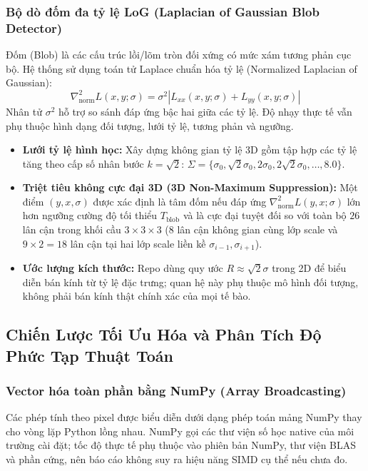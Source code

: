 \documentclass[conference]{IEEEtran}
\begin{document}
\subsubsection{Bộ dò đốm đa tỷ lệ LoG (Laplacian of Gaussian Blob Detector)}
Đốm (Blob) là các cấu trúc lồi/lõm tròn đối xứng có mức xám tương phản cục bộ.
Hệ thống sử dụng toán tử Laplace chuẩn hóa tỷ lệ (Normalized Laplacian of Gaussian):
\begin{equation}
\nabla_{\text{norm}}^2 L(x, y; \sigma) = \sigma^2 |L_{xx}(x, y; \sigma) + L_{yy}(x, y; \sigma)|
\end{equation}
Nhân tử $\sigma^2$ hỗ trợ so sánh đáp ứng bậc hai giữa các tỷ lệ. Độ nhạy thực tế vẫn phụ thuộc hình dạng đối tượng, lưới tỷ lệ, tương phản và ngưỡng.
\begin{itemize}
    \item \textbf{Lưới tỷ lệ hình học:} Xây dựng không gian tỷ lệ 3D gồm tập hợp các tỷ lệ tăng theo cấp số nhân bước $k = \sqrt{2}$: $\Sigma = \{\sigma_0, \sqrt{2}\sigma_0, 2\sigma_0, 2\sqrt{2}\sigma_0, \dots, 8.0\}$.
    \item \textbf{Triệt tiêu không cực đại 3D (3D Non-Maximum Suppression):} Một điểm $(y, x, \sigma)$ được xác định là tâm đốm nếu đáp ứng $\nabla_{\text{norm}}^2 L(y, x; \sigma)$ lớn hơn ngưỡng cường độ tối thiểu $T_{\text{blob}}$ và là cực đại tuyệt đối so với toàn bộ $26$ lân cận trong khối cầu $3 \times 3 \times 3$ (8 lân cận không gian cùng lớp scale và $9 \times 2 = 18$ lân cận tại hai lớp scale liền kề $\sigma_{i-1}, \sigma_{i+1}$).
    \item \textbf{Ước lượng kích thước:} Repo dùng quy ước $R\approx\sqrt2\sigma$ trong 2D để biểu diễn bán kính từ tỷ lệ đặc trưng; quan hệ này phụ thuộc mô hình đối tượng, không phải bán kính thật chính xác của mọi tế bào.
\end{itemize}



\subsection{Chiến Lược Tối Ưu Hóa và Phân Tích Độ Phức Tạp Thuật Toán}
\subsubsection{Vector hóa toàn phần bằng NumPy (Array Broadcasting)}
Các phép tính theo pixel được biểu diễn dưới dạng phép toán mảng NumPy thay cho vòng lặp Python lồng nhau. NumPy gọi các thư viện số học native của môi trường cài đặt; tốc độ thực tế phụ thuộc vào phiên bản NumPy, thư viện BLAS và phần cứng, nên báo cáo không suy ra hiệu năng SIMD cụ thể nếu chưa đo.
\end{document}
